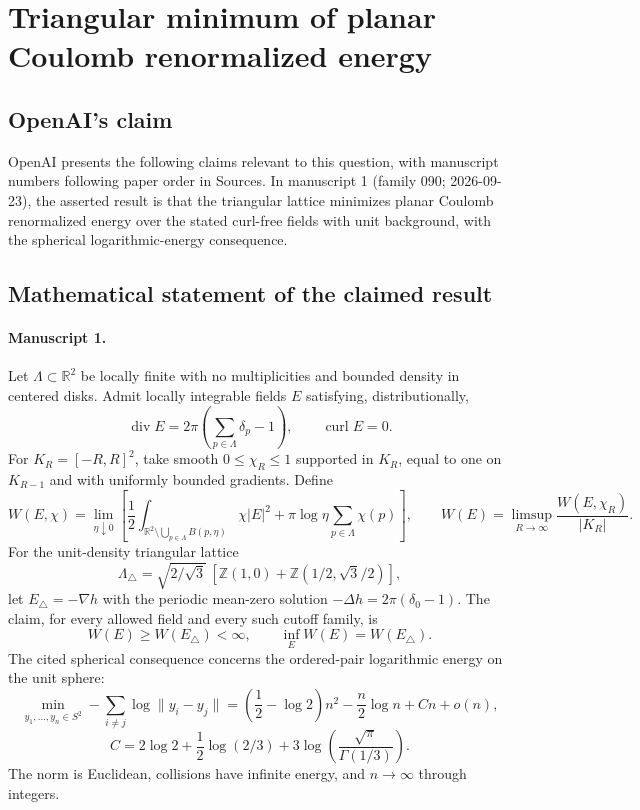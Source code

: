 \documentclass[11pt]{article}
\begin{document}
\section*{Triangular minimum of planar Coulomb renormalized energy}

\subsection{OpenAI's claim}
OpenAI presents the following claims relevant to this question, with manuscript numbers following paper order in Sources. In manuscript 1 (family 090; 2026-09-23), the asserted result is that the triangular lattice minimizes planar Coulomb renormalized energy over the stated curl-free fields with unit background, with the spherical logarithmic-energy consequence.

\subsection{Mathematical statement of the claimed result}
\paragraph{Manuscript 1.}
Let $\Lambda\subset\mathbb R^2$ be locally finite with no multiplicities and bounded density in centered disks. Admit locally integrable fields $E$ satisfying, distributionally,
\[
 \operatorname{div}E=2\pi(\sum_{p\in\Lambda}\delta_p-1),\qquad
 \operatorname{curl}E=0.
\]
For $K_R=[-R,R]^2$, take smooth $0\le\chi_R\le1$ supported in $K_R$, equal to one on $K_{R-1}$ and with uniformly bounded gradients. Define
\[
 W(E,\chi)=\lim_{\eta\downarrow0}
 \left[\frac12\int_{\mathbb R^2\setminus\bigcup_{p\in\Lambda}B(p,\eta)}\chi|E|^2
       +\pi\log\eta\sum_{p\in\Lambda}\chi(p)\right],
 \qquad W(E)=\limsup_{R\to\infty}\frac{W(E,\chi_R)}{|K_R|}.
\]
For the unit-density triangular lattice
\[
 \Lambda_{\triangle}=\sqrt{2/\sqrt3}\,[\mathbb Z(1,0)+\mathbb Z(1/2,\sqrt3/2)],
\]
let $E_{\triangle}=-\nabla h$ with the periodic mean-zero solution $-\Delta h=2\pi(\delta_0-1)$. The claim, for every allowed field and every such cutoff family, is
\[
 W(E)\ge W(E_{\triangle})<\infty,
 \qquad\inf_E W(E)=W(E_{\triangle}).
\]
The cited spherical consequence concerns the ordered-pair logarithmic energy on the unit sphere:
\[
 \min_{y_1,\ldots,y_n\in S^2}-\sum_{i\ne j}\log\|y_i-y_j\|
 =\left(\frac12-\log2\right)n^2-\frac n2\log n+C n+o(n),
\]
\[
 C=2\log2+\frac12\log(2/3)
           +3\log\left(\frac{\sqrt\pi}{\Gamma(1/3)}\right).
\]
The norm is Euclidean, collisions have infinite energy, and $n\to\infty$ through integers.
\end{document}
